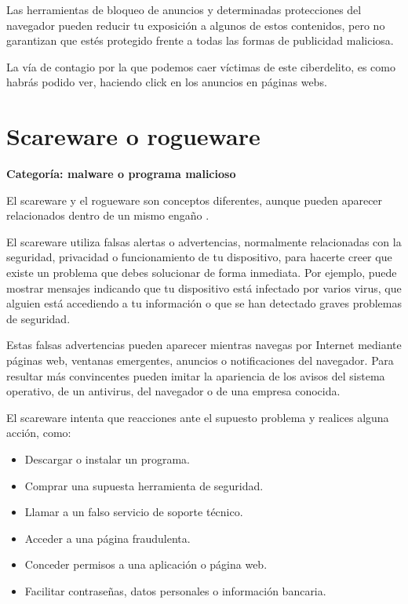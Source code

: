 \documentclass[
  spanish,
  a4paper,
  openany]{book}
\begin{document}
Las herramientas de bloqueo de anuncios y determinadas protecciones del navegador pueden reducir tu exposición a algunos de estos contenidos, pero no garantizan que estés protegido frente a todas las formas de publicidad maliciosa.

La vía de contagio por la que podemos caer víctimas de este ciberdelito, es como habrás podido ver, haciendo click en los anuncios en páginas webs.

\section{Scareware o rogueware}\label{scareware-o-rogueware}

\textbf{Categoría: malware o programa malicioso}

El scareware y el rogueware son conceptos diferentes, aunque pueden aparecer relacionados dentro de un mismo engaño \citep{KASPER-scareware}.

El scareware utiliza falsas alertas o advertencias, normalmente relacionadas con la seguridad, privacidad o funcionamiento de tu dispositivo, para hacerte creer que existe un problema que debes solucionar de forma inmediata. Por ejemplo, puede mostrar mensajes indicando que tu dispositivo está infectado por varios virus, que alguien está accediendo a tu información o que se han detectado graves problemas de seguridad.

Estas falsas advertencias pueden aparecer mientras navegas por Internet mediante páginas web, ventanas emergentes, anuncios o notificaciones del navegador. Para resultar más convincentes pueden imitar la apariencia de los avisos del sistema operativo, de un antivirus, del navegador o de una empresa conocida.

El scareware intenta que reacciones ante el supuesto problema y realices alguna acción, como:

\begin{itemize}
\item
  Descargar o instalar un programa.
\item
  Comprar una supuesta herramienta de seguridad.
\item
  Llamar a un falso servicio de soporte técnico.
\item
  Acceder a una página fraudulenta.
\item
  Conceder permisos a una aplicación o página web.
\item
  Facilitar contraseñas, datos personales o información bancaria.
\end{itemize}
\end{document}
